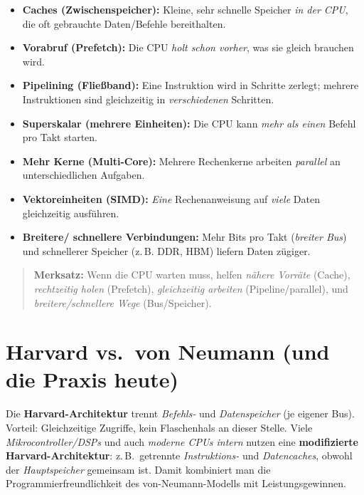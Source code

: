 \documentclass[../skript/main.tex]{subfiles}
\begin{document}
\begin{itemize}
	\item \textbf{Caches (Zwischenspeicher):} Kleine, sehr schnelle Speicher \emph{in der CPU}, die oft gebrauchte Daten/Befehle bereithalten. %
	\item \textbf{Vorabruf (Prefetch):} Die CPU \emph{holt schon vorher}, was sie gleich brauchen wird. %
	\item \textbf{Pipelining (Fließband):} Eine Instruktion wird in Schritte zerlegt; mehrere Instruktionen sind gleichzeitig in \emph{verschiedenen} Schritten. %
	\item \textbf{Superskalar (mehrere Einheiten):} Die CPU kann \emph{mehr als einen} Befehl pro Takt starten. %
	\item \textbf{Mehr Kerne (Multi-Core):} Mehrere Rechenkerne arbeiten \emph{parallel} an unterschiedlichen Aufgaben. %
	\item \textbf{Vektoreinheiten (SIMD):} \emph{Eine} Rechenanweisung auf \emph{viele} Daten gleichzeitig ausführen. %
	\item \textbf{Breitere/ schnellere Verbindungen:} Mehr Bits pro Takt (\emph{breiter Bus}) und schnellerer Speicher (z.\,B. DDR, HBM) liefern Daten zügiger. %
\end{itemize}

\begin{quote}\small
	\textbf{Merksatz:} Wenn die CPU warten muss, helfen \emph{nähere Vorräte} (Cache), \emph{rechtzeitig holen} (Prefetch), \emph{gleichzeitig arbeiten} (Pipeline/parallel), und \emph{breitere/schnellere Wege} (Bus/Speicher).
\end{quote}


\section{Harvard vs.\ von Neumann (und die Praxis heute)}
Die \textbf{Harvard-Architektur} trennt \emph{Befehls-} und \emph{Datenspeicher} (je eigener Bus).
Vorteil: Gleichzeitige Zugriffe, kein Flaschenhals an dieser Stelle. Viele \emph{Mikrocontroller/DSPs}
und auch \emph{moderne CPUs intern} nutzen eine \textbf{modifizierte Harvard-Architektur}:
z.\,B.\ getrennte \emph{Instruktions-} und \emph{Datencaches}, obwohl der \emph{Hauptspeicher} gemeinsam ist.
Damit kombiniert man die Programmierfreundlichkeit des von-Neumann-Modells mit Leistungsgewinnen.

	
\end{document}
